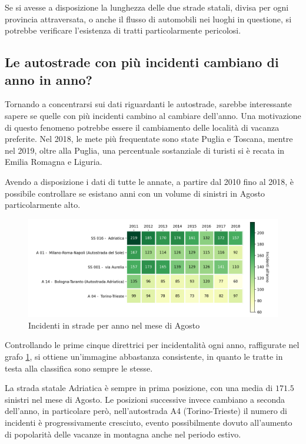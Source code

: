 \documentclass[a4paper,12pt]{report}
\begin{document}
Se si avesse a disposizione la lunghezza delle due strade statali, 
divisa per ogni provincia attraversata,
o anche il flusso di automobili nei luoghi in questione, 
si potrebbe verificare l'esistenza di tratti particolarmente pericolosi. 

\subsection{Le autostrade con più incidenti cambiano di anno in anno?}

Tornando a concentrarsi sui dati riguardanti le autostrade, 
sarebbe interessante sapere se quelle 
con più incidenti cambino al cambiare dell'anno. 
Una motivazione di questo fenomeno potrebbe essere il cambiamento 
delle località di vacanza preferite. 
Nel 2018, le mete più frequentate sono state Puglia e 
Toscana\cite{INFOGRAFICA_ISTAT:1}, mentre nel 2019, oltre alla Puglia, 
una percentuale sostanziale di turisti si è recata in 
Emilia Romagna e Liguria\cite{REPORT_ISTAT_2019:1}. 

Avendo a disposizione i dati di tutte le annate, a partire dal 2010 fino al 2018, 
è possibile controllare se esistano anni con un volume di 
sinistri in Agosto particolarmente alto. 

\begin{figure}
    \includegraphics[width=\linewidth]{../src/incidenti/incidenti_aci/agosto/vacanze_autostrade.png}
    \caption{Incidenti in strade per anno nel mese di Agosto}
    \label{fig:autostrade-anno}
\end{figure}

Controllando le prime cinque direttrici per incidentalità ogni anno, 
raffigurate nel grafo \ref{fig:autostrade-anno}, si ottiene un'immagine 
abbastanza consistente, in quanto le tratte in testa alla classifica sono 
sempre le stesse. 

La strada statale Adriatica è sempre in prima posizione, con una media di $171.5$ 
sinistri nel mese di Agosto. 
Le posizioni successive invece cambiano a seconda dell'anno, in particolare però, 
nell'autostrada A4 (Torino-Trieste) il numero di incidenti è progressivamente cresciuto, 
evento possibilmente dovuto all'aumento di popolarità delle vacanze 
in montagna anche nel periodo estivo. 
\end{document}
